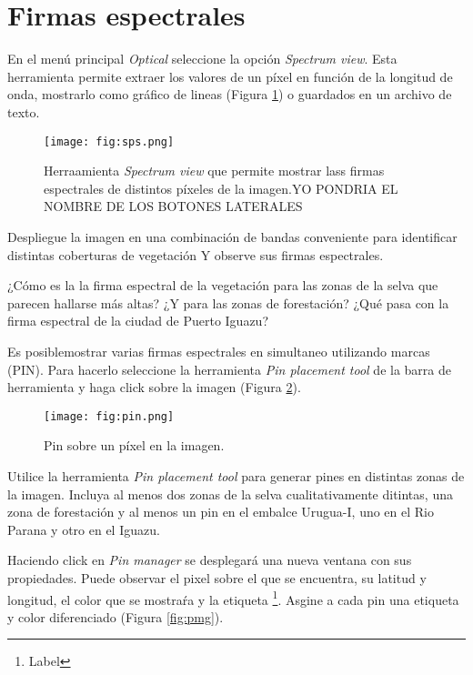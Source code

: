 \section{Firmas espectrales}

En el menú principal \emph{Optical} seleccione la opción \emph{Spectrum view}. Esta herramienta permite extraer los valores de un píxel en función de la longitud de onda, mostrarlo como gráfico de lineas (Figura \ref{fig:sps}) o guardados en un archivo de texto.

\begin{figure}[h!]
    \centering
    \texttt{[image: fig:sps.png]}
    \caption{Herraamienta \emph{Spectrum view} que permite mostrar lass firmas espectrales de distintos píxeles de la imagen.YO PONDRIA EL  NOMBRE DE LOS BOTONES LATERALES}
    \label{fig:sps}
\end{figure}

Despliegue la imagen  en una combinación de bandas conveniente para identificar distintas coberturas de vegetación Y observe sus firmas espectrales.

\begin{que}
    ¿Cómo es la la firma espectral de la vegetación para las zonas de la selva que parecen hallarse más altas? %
    ¿Y para las zonas de forestación? ¿Qué pasa con la firma espectral de la ciudad de Puerto Iguazu?
\end{que}

Es posiblemostrar varias firmas espectrales en simultaneo utilizando marcas (PIN). Para hacerlo seleccione la herramienta \emph{Pin placement tool}  de la barra de herramienta %
 y haga click sobre la imagen (Figura \ref{fig:pin}).

\begin{figure}[h!]
    \centering
    \texttt{[image: fig:pin.png]}
    \caption{Pin sobre un píxel en la imagen.}
    \label{fig:pin}
\end{figure}

Utilice la herramienta \emph{Pin placement tool} para generar pines en distintas zonas de la imagen. Incluya al menos dos zonas de la selva cualitativamente ditintas, una zona de forestación y al menos un pin en el embalce Urugua-I, uno en el Rio Parana y otro en el Iguazu.

Haciendo click en \emph{Pin manager} se desplegará una nueva ventana con sus propiedades. Puede observar el pixel sobre el que se encuentra, su latitud y longitud, el color que se mostraŕa y la etiqueta \footnote{Label}. Asgine a cada pin una etiqueta y color diferenciado (Figura \ref{fig:pmg}).

